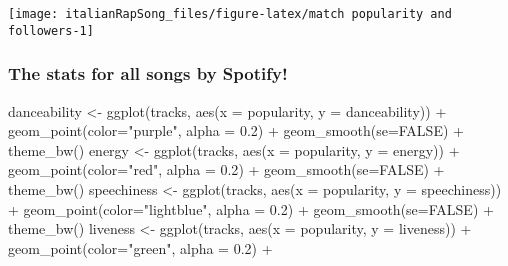 \documentclass[
]{article}
\newenvironment{Shaded}{\begin{snugshade}}{\end{snugshade}}
\newcommand{\AttributeTok}[1]{\textcolor[rgb]{0.77,0.63,0.00}{#1}}
\newcommand{\ConstantTok}[1]{\textcolor[rgb]{0.00,0.00,0.00}{#1}}
\newcommand{\FloatTok}[1]{\textcolor[rgb]{0.00,0.00,0.81}{#1}}
\newcommand{\FunctionTok}[1]{\textcolor[rgb]{0.00,0.00,0.00}{#1}}
\newcommand{\NormalTok}[1]{#1}
\newcommand{\OtherTok}[1]{\textcolor[rgb]{0.56,0.35,0.01}{#1}}
\newcommand{\SpecialCharTok}[1]{\textcolor[rgb]{0.00,0.00,0.00}{#1}}
\newcommand{\StringTok}[1]{\textcolor[rgb]{0.31,0.60,0.02}{#1}}
\begin{document}
\begin{center}\texttt{[image: italianRapSong\_files/figure-latex/match popularity and followers-1]} \end{center}

\hypertarget{the-stats-for-all-songs-by-spotify}{%
\subsubsection{The stats for all songs by
Spotify!}\label{the-stats-for-all-songs-by-spotify}}

\begin{Shaded}
\begin{Highlighting}[]
\NormalTok{danceability }\OtherTok{\textless{}{-}} \FunctionTok{ggplot}\NormalTok{(tracks, }\FunctionTok{aes}\NormalTok{(}\AttributeTok{x =}\NormalTok{ popularity, }\AttributeTok{y =}\NormalTok{ danceability)) }\SpecialCharTok{+}
  \FunctionTok{geom\_point}\NormalTok{(}\AttributeTok{color=}\StringTok{"purple"}\NormalTok{, }\AttributeTok{alpha =} \FloatTok{0.2}\NormalTok{) }\SpecialCharTok{+}
  \FunctionTok{geom\_smooth}\NormalTok{(}\AttributeTok{se=}\ConstantTok{FALSE}\NormalTok{) }\SpecialCharTok{+}
  \FunctionTok{theme\_bw}\NormalTok{()}
\NormalTok{energy }\OtherTok{\textless{}{-}} \FunctionTok{ggplot}\NormalTok{(tracks, }\FunctionTok{aes}\NormalTok{(}\AttributeTok{x =}\NormalTok{ popularity, }\AttributeTok{y =}\NormalTok{ energy)) }\SpecialCharTok{+}
  \FunctionTok{geom\_point}\NormalTok{(}\AttributeTok{color=}\StringTok{"red"}\NormalTok{, }\AttributeTok{alpha =} \FloatTok{0.2}\NormalTok{) }\SpecialCharTok{+}
  \FunctionTok{geom\_smooth}\NormalTok{(}\AttributeTok{se=}\ConstantTok{FALSE}\NormalTok{) }\SpecialCharTok{+}
  \FunctionTok{theme\_bw}\NormalTok{()}
\NormalTok{speechiness }\OtherTok{\textless{}{-}} \FunctionTok{ggplot}\NormalTok{(tracks, }\FunctionTok{aes}\NormalTok{(}\AttributeTok{x =}\NormalTok{ popularity, }\AttributeTok{y =}\NormalTok{ speechiness)) }\SpecialCharTok{+}
  \FunctionTok{geom\_point}\NormalTok{(}\AttributeTok{color=}\StringTok{"lightblue"}\NormalTok{, }\AttributeTok{alpha =} \FloatTok{0.2}\NormalTok{) }\SpecialCharTok{+}
  \FunctionTok{geom\_smooth}\NormalTok{(}\AttributeTok{se=}\ConstantTok{FALSE}\NormalTok{) }\SpecialCharTok{+}
  \FunctionTok{theme\_bw}\NormalTok{()}
\NormalTok{liveness }\OtherTok{\textless{}{-}} \FunctionTok{ggplot}\NormalTok{(tracks, }\FunctionTok{aes}\NormalTok{(}\AttributeTok{x =}\NormalTok{ popularity, }\AttributeTok{y =}\NormalTok{ liveness)) }\SpecialCharTok{+}
  \FunctionTok{geom\_point}\NormalTok{(}\AttributeTok{color=}\StringTok{"green"}\NormalTok{, }\AttributeTok{alpha =} \FloatTok{0.2}\NormalTok{) }\SpecialCharTok{+}

\end{Highlighting}
\end{Shaded}
\end{document}
